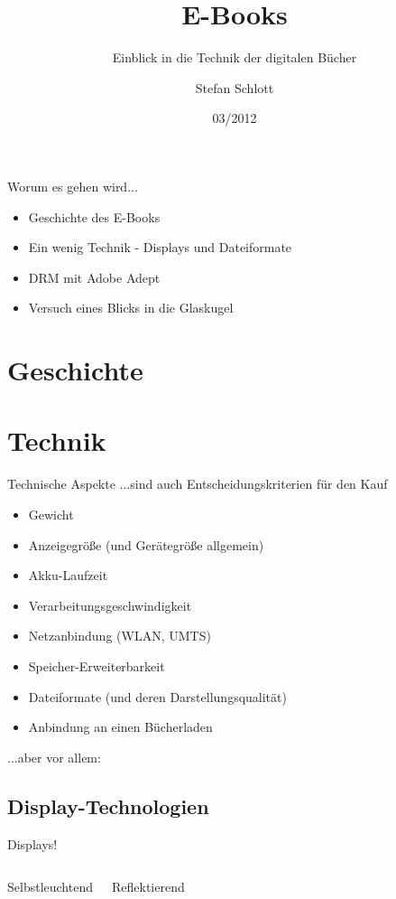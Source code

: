 \documentclass[hyperref={pdfpagelabels=false}]{beamer}
\title{E-Books}
\subtitle{Einblick in die Technik der digitalen Bücher}
\author{%
		Stefan Schlott%
}
\institute{%
	Web: \url{http://stefan.ploing.de/} \\
	Twitter: \href{https://twitter.com/\_skyr}{@\_skyr}
}
\date{03/2012}
\begin{document}
\begin{frame}[plain]
\titlepage
\end{frame}


\begin{frame}{Worum es gehen wird...}
	\begin{itemize}
		\item Geschichte des E-Books
		\item Ein wenig Technik - Displays und Dateiformate
		\item DRM mit Adobe Adept
		\item Versuch eines Blicks in die Glaskugel
	\end{itemize}
\end{frame}


\section{Geschichte}




\section{Technik}

\begin{frame}{Technische Aspekte}
	...sind auch Entscheidungskriterien für den Kauf
	\begin{itemize}
		\item Gewicht
		\item Anzeigegröße (und Gerätegröße allgemein)
		\item Akku-Laufzeit
		\item Verarbeitungsgeschwindigkeit
		\item Netzanbindung (WLAN, UMTS)
		\item Speicher-Erweiterbarkeit
		\item Dateiformate (und deren Darstellungsqualität)
		\item Anbindung an einen Bücherladen
	\end{itemize}
	...aber vor allem:
\end{frame}

\subsection{Display-Technologien}

\begin{frame}{Displays!}
	\begin{columns}
			Selbstleuchtend
			\smallskip

			Reflektierend
			\smallskip

	\end{columns}
\end{frame}
\end{document}
